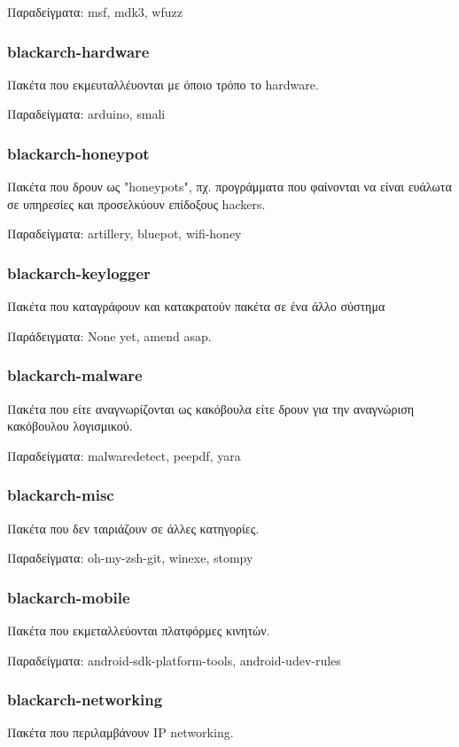 \documentclass[a4paper, oneside, 11pt]{book}
\begin{document}
Παραδείγματα: msf, mdk3, wfuzz

\subsubsection{blackarch-hardware}
Πακέτα που εκμευταλλέυονται με όποιο τρόπο το hardware.

Παραδείγματα: arduino, smali

\subsubsection{blackarch-honeypot}
Πακέτα που δρουν ως "honeypots", πχ. προγράμματα που φαίνονται
να είναι ευάλωτα σε υπηρεσίες και προσελκύουν επίδοξους hackers.

Παραδείγματα: artillery, bluepot, wifi-honey

\subsubsection{blackarch-keylogger}
Πακέτα που καταγράφουν και κατακρατούν πακέτα σε ένα άλλο σύστημα

Παράδειγματα: None yet, amend asap.

\subsubsection{blackarch-malware}
Πακέτα που είτε αναγνωρίζονται ως κακόβουλα είτε
δρουν για την αναγνώριση κακόβουλου λογισμικού.

Παραδείγματα: malwaredetect, peepdf, yara

\subsubsection{blackarch-misc}
Πακέτα που δεν ταιριάζουν σε άλλες κατηγορίες.

Παραδείγματα: oh-my-zsh-git, winexe, stompy

\subsubsection{blackarch-mobile}
Πακέτα που εκμεταλλεύονται πλατφόρμες κινητών.

Παραδείγματα: android-sdk-platform-tools, android-udev-rules

\subsubsection{blackarch-networking}
Πακέτα που περιλαμβάνουν IP networking.
\end{document}
